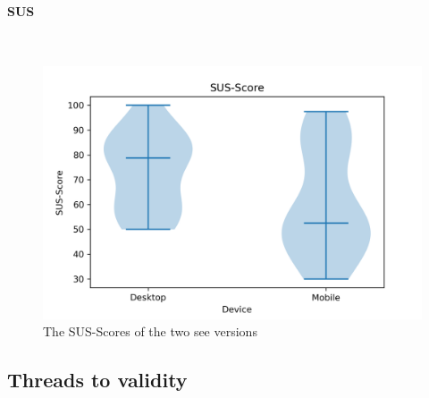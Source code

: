 \paragraph{SUS}\mbox{}\\
\begin{table}[htb]
  \caption{The \gls{sus}-scores from all 18 subjects. The first row contains the \gls{sus}-scores for the desktop application and the second row for the mobile application. The figures have been rounded to whole numbers.}
  \end{table}

  \begin{figure}[H]
    \centering
    \includegraphics[width=1\textwidth]{Evaluation/img/SUS-Score_violin.png}
    \caption{The SUS-Scores of the two \gls{see} versions}\label{fig:sus-vio}
  \end{figure}

  \subsection{Threads to validity}
  \label{sec:validity}